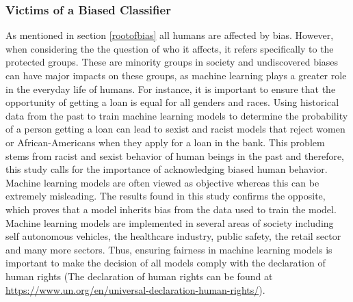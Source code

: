 \documentclass[11pt, fleqn, titlepage]{article}
\begin{document}
	\subsubsection{Victims of a Biased Classifier}
	As mentioned in section \ref{rootofbias} all humans are affected by bias. However, when considering the the question of who it affects, it refers specifically to the protected groups. These are minority groups in society and undiscovered biases can have major impacts on these groups, as machine learning plays a greater role in the everyday life of humans. For instance, it is important to ensure that the opportunity of getting a loan is equal for all genders and races. Using historical data from the past to train machine learning models to determine the probability of a person getting a loan can lead to sexist and racist models that reject women or African-Americans when they apply for a loan in the bank. This problem stems from racist and sexist behavior of human beings in the past and therefore, this study calls for the importance of acknowledging biased human behavior. Machine learning models are often viewed as objective whereas this can be extremely misleading. The results found in this study confirms the opposite, which proves that a model inherits bias from the data used to train the model. Machine learning models are implemented in several areas of society including self autonomous vehicles, the healthcare industry, public safety, the retail sector and many more sectors. Thus, ensuring fairness in machine learning models is important to make the decision of all models comply with the declaration of human rights (The declaration of human rights can be found at \url{https://www.un.org/en/universal-declaration-human-rights/}).
	
\end{document}
